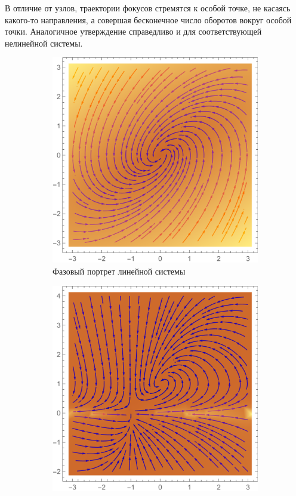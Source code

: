 \documentclass[12pt, a4paper]{article}
\begin{document}
\begin{enumerate}
В отличие от узлов, траектории фокусов стремятся к особой точке, не касаясь какого-то направления, а совершая бесконечное число оборотов вокруг особой точки. Аналогичное утверждение справедливо и для соответствующей нелинейной системы.
\begin{figure}[H]
	\centering
	\begin{subfigure}[H]{0.4\textwidth}
		\includegraphics[width=\textwidth]{p4}
		\caption{Фазовый портрет линейной системы}
	\end{subfigure}
	\qquad\qquad
	\begin{subfigure}[H]{0.4\textwidth}
		\includegraphics[width=\textwidth]{p44}

\end{subfigure}
\end{figure}
\end{enumerate}
\end{document}
